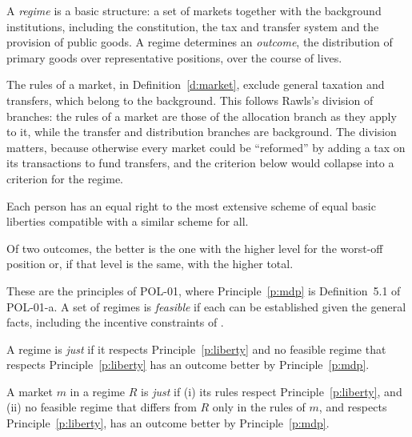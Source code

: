 \documentclass{situationist-preprint}
\begin{document}
\begin{definition}\label{d:regime}
A \emph{regime} is a basic structure: a set of markets together with the background institutions, including the constitution, the tax and transfer system and the provision of public goods. A regime determines an \emph{outcome}, the distribution of primary goods over representative positions, over the course of lives.
\end{definition}

The rules of a market, in Definition~\ref{d:market}, exclude general taxation and transfers, which belong to the background. This follows Rawls's division of branches: the rules of a market are those of the allocation branch as they apply to it, while the transfer and distribution branches are background. The division matters, because otherwise every market could be \enquote{reformed} by adding a tax on its transactions to fund transfers, and the criterion below would collapse into a criterion for the regime.

\begin{principle}\label{p:liberty}
Each person has an equal right to the most extensive scheme of equal basic liberties compatible with a similar scheme for all.
\end{principle}

\begin{principle}\label{p:mdp}
Of two outcomes, the better is the one with the higher level for the worst-off position or, if that level is the same, with the higher total.
\end{principle}

These are the principles of POL-01, where Principle~\ref{p:mdp} is Definition~5.1 of POL-01-a. A set of regimes is \emph{feasible} if each can be established given the general facts, including the incentive constraints of \citet{Mirrlees1971}.

\begin{definition}\label{d:justregime}
A regime is \emph{just} if it respects Principle~\ref{p:liberty} and no feasible regime that respects Principle~\ref{p:liberty} has an outcome better by Principle~\ref{p:mdp}.
\end{definition}

\begin{definition}\label{d:justmarket}
A market $m$ in a regime $R$ is \emph{just} if (i) its rules respect Principle~\ref{p:liberty}, and (ii) no feasible regime that differs from $R$ only in the rules of $m$, and respects Principle~\ref{p:liberty}, has an outcome better by Principle~\ref{p:mdp}.
\end{definition}
\end{document}
